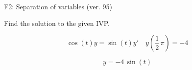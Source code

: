 \begin{exercise}
  \begin{exerciseTitle}F2: Separation of variables (ver. 95)\end{exerciseTitle}
  \begin{exerciseStatement}
    
Find the solution to the given IVP.

    
\[\cos\left(t\right) y= \sin\left(t\right) y'\hspace{1em} y\left( \frac{1}{2} \, \pi \right)= -4\]

  \end{exerciseStatement}
  \begin{exerciseAnswer}
    
\[y= -4 \, \sin\left(t\right)\]

  \end{exerciseAnswer}
\end{exercise}